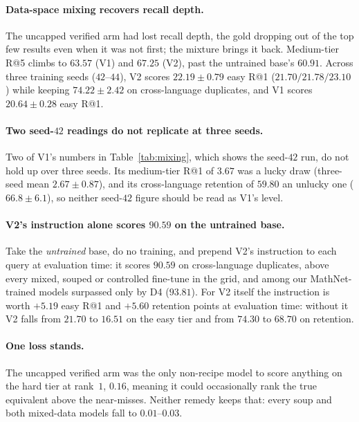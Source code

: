 \paragraph{Data-space mixing recovers recall depth.}The uncapped verified arm had lost recall depth, the gold dropping out of the top few results even when it was not first; the mixture brings it back. Medium-tier R@5 climbs to $63.57$ (V1) and $67.25$ (V2), past the untrained base's $60.91$. Across three training seeds ($42$--$44$), V2 scores $22.19 \pm 0.79$ easy R@1 ($21.70/21.78/23.10$) while keeping $74.22 \pm 2.42$ on cross-language duplicates, and V1 scores $20.64 \pm 0.28$ easy R@1.


\paragraph{Two seed-$42$ readings do not replicate at three seeds.}Two of V1's numbers in Table~\ref{tab:mixing}, which shows the seed-$42$ run, do not hold up over three seeds. Its medium-tier R@1 of $3.67$ was a lucky draw (three-seed mean $2.67 \pm 0.87$), and its cross-language retention of $59.80$ an unlucky one ($66.8 \pm 6.1$), so neither seed-$42$ figure should be read as V1's level.

\paragraph{V2's instruction alone scores $90.59$ on the untrained base.}Take the \emph{untrained} base, do no training, and prepend V2's instruction to each query at evaluation time: it scores $90.59$ on cross-language duplicates, above every mixed, souped or controlled fine-tune in the grid, and among our MathNet-trained models surpassed only by D4 ($93.81$). For V2 itself the instruction is worth ${+}5.19$ easy R@1 and ${+}5.60$ retention points at evaluation time: without it V2 falls from $21.70$ to $16.51$ on the easy tier and from $74.30$ to $68.70$ on retention.

\paragraph{One loss stands.}The uncapped verified arm was the only non-recipe model to score anything on the hard tier at rank~$1$, $0.16$, meaning it could occasionally rank the true equivalent above the near-misses. Neither remedy keeps that: every soup and both mixed-data models fall to $0.01$--$0.03$.

